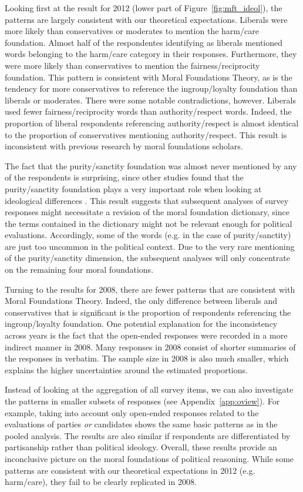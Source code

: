 \documentclass[12pt]{article}
\begin{document}
Looking first at the result for 2012 (lower part of Figure~\ref{fig:mft_ideol}), the patterns are largely consistent with our theoretical expectations. Liberals were more likely than conservatives or moderates to mention the harm/care foundation. Almost half of the respondentes identifying as liberals mentioned words belonging to the harm/care category in their responses. Furthermore, they were more likely than conservatives to mention the fairness/reciprocity foundation. This pattern is consistent with Moral Foundations Theory, as is the tendency for more conservatives to reference the ingroup/loyalty foundation than liberals or moderates. There were some notable contradictions, however. Liberals used fewer fairness/reciprocity words than authority/respect words. Indeed, the proportion of liberal respondents referencing authority/respect is almost identical to the proportion of conservatives mentioning authority/respect. This result is inconsistent with previous research by moral foundations scholars.

The fact that the purity/sanctity foundation was almost never mentioned by any of the respondents is surprising, since other studies found that the purity/sanctity foundation plays a very important role when looking at ideological differences \citep{koleva2012tracing}. This result suggests that subsequent analyses of survey responses might necessitate a revision of the moral foundation dictionary, since the terms contained in the dictionary might not be relevant enough for political evaluations. Accordingly, some of the words (e.g. in the case of purity/sanctity) are just too uncommon in the political context. Due to the very rare mentioning of the purity/sanctity dimension, the subsequent analyses will only concentrate on the remaining four moral foundations.

Turning to the results for 2008, there are fewer patterns that are consistent with Moral Foundations Theory. Indeed, the only difference between liberals and conservatives that is significant is the proportion of respondents referencing the ingroup/loyalty foundation. One potential explanation for the inconsistency across years is the fact that the open-ended responses were recorded in a more indirect manner in 2008. Many responses in 2008 consist of shorter summaries of the responses in verbatim. The sample size in 2008 is also much smaller, which explains the higher uncertainties around the estimated proportions.

Instead of looking at the aggregation of all survey items, we can also investigate the patterns in smaller subsets of responses (see Appendix~\ref{app:oview}). For example, taking into account only open-ended responses related to the evaluations of parties \textit{or} candidates shows the same basic patterns as in the pooled analysis. The results are also similar if respondents are differentiated by partisanship rather than political ideology. Overall, these results provide an inconclusive picture on the moral foundations of political reasoning. While some patterns are consistent with our theoretical expectations in 2012 (e.g. harm/care), they fail to be clearly replicated in 2008.
\end{document}
